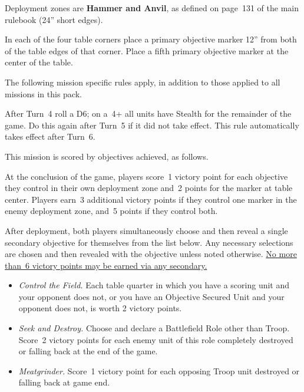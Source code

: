 \documentclass{40k}
\begin{document}
Deployment zones are \textbf{Hammer and Anvil}, as defined on page~131
of the main rulebook (24'' short edges).

\bigskip%
In each of the four table corners place a primary objective marker
12'' from both of the table edges of that corner.  Place a fifth
primary objective marker at the center of the table.


The following mission specific rules apply, in addition to those
applied to all missions in this pack.

  After Turn~4 roll a D6; on a~4+
all units have Stealth for the remainder of the game.  Do this again
after Turn~5 if it did not take effect.  This rule automatically takes
effect after Turn~6.



This mission is scored by objectives achieved, as follows.

 At the conclusion of the game,
players score~1 victory point for each objective they control in their
own deployment zone and~2 points for the marker at table center.
Players earn~3 additional victory points if they control one marker in
the enemy deployment zone, and~5 points if they control both.


After deployment, both players simultaneously choose and then reveal a
single secondary objective for themselves from the list below.  Any
necessary selections are chosen and then revealed with the objective
unless noted otherwise.  \underline{No more than~6 victory points may
  be earned via any secondary.}

\begin{itemize}
\item \textit{Control the Field.}  Each table quarter in which you
  have a scoring unit and your opponent does not, or you have an
  Objective Secured Unit and your opponent does not, is worth 2
  victory points.

\item \textit{Seek and Destroy.}  Choose and declare a Battlefield
  Role other than Troop.  Score~2 victory points for each enemy unit
  of this role completely destroyed or falling back at the end of the
  game.

\item \textit{Meatgrinder.}  Score~1 victory point for each opposing
  Troop unit destroyed or falling back at game end.

\end{itemize}
\end{document}
